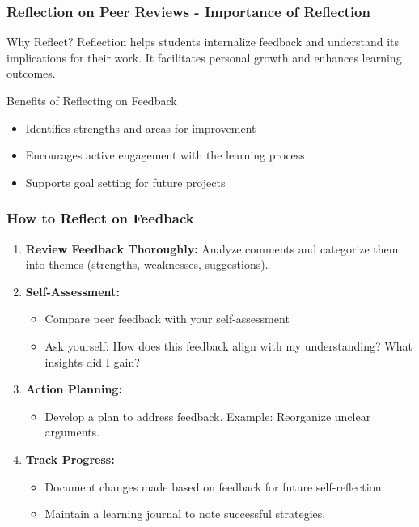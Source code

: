 \documentclass[aspectratio=169]{beamer}
\begin{document}
\begin{frame}[fragile]
    \frametitle{Reflection on Peer Reviews - Importance of Reflection}
    \begin{block}{Why Reflect?}
        Reflection helps students internalize feedback and understand its implications for their work. It facilitates personal growth and enhances learning outcomes.
    \end{block}

    \begin{block}{Benefits of Reflecting on Feedback}
        \begin{itemize}
            \item Identifies strengths and areas for improvement
            \item Encourages active engagement with the learning process
            \item Supports goal setting for future projects
        \end{itemize}
    \end{block}
\end{frame}

\begin{frame}[fragile]
    \frametitle{How to Reflect on Feedback}
    \begin{enumerate}
        \item \textbf{Review Feedback Thoroughly:} Analyze comments and categorize them into themes (strengths, weaknesses, suggestions).
        \item \textbf{Self-Assessment:}
        \begin{itemize}
            \item Compare peer feedback with your self-assessment
            \item Ask yourself: How does this feedback align with my understanding? What insights did I gain?
        \end{itemize}
        \item \textbf{Action Planning:}
        \begin{itemize}
            \item Develop a plan to address feedback. Example: Reorganize unclear arguments.
        \end{itemize}
        \item \textbf{Track Progress:}
        \begin{itemize}
            \item Document changes made based on feedback for future self-reflection.
            \item Maintain a learning journal to note successful strategies.
        \end{itemize}
    \end{enumerate}
\end{frame}
\end{document}
